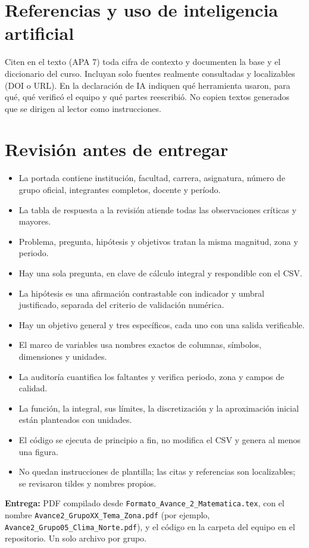 \documentclass[11pt,a4paper]{article}
\begin{document}
\section{Referencias y uso de inteligencia artificial}
Citen en el texto (APA 7) toda cifra de contexto y documenten la base y el diccionario del curso. Incluyan solo fuentes realmente consultadas y localizables (DOI o URL). En la declaración de IA indiquen qué herramienta usaron, para qué, qué verificó el equipo y qué partes reescribió. No copien textos generados que se dirigen al lector como instrucciones.

\section*{Revisión antes de entregar}
\begin{itemize}[label=$\square$]
  \item La portada contiene institución, facultad, carrera, asignatura, número de grupo oficial, integrantes completos, docente y período.
  \item La tabla de respuesta a la revisión atiende todas las observaciones críticas y mayores.
  \item Problema, pregunta, hipótesis y objetivos tratan la misma magnitud, zona y periodo.
  \item Hay una sola pregunta, en clave de cálculo integral y respondible con el CSV.
  \item La hipótesis es una afirmación contrastable con indicador y umbral justificado, separada del criterio de validación numérica.
  \item Hay un objetivo general y tres específicos, cada uno con una salida verificable.
  \item El marco de variables usa nombres exactos de columnas, símbolos, dimensiones y unidades.
  \item La auditoría cuantifica los faltantes y verifica periodo, zona y campos de calidad.
  \item La función, la integral, sus límites, la discretización y la aproximación inicial están planteados con unidades.
  \item El código se ejecuta de principio a fin, no modifica el CSV y genera al menos una figura.
  \item No quedan instrucciones de plantilla; las citas y referencias son localizables; se revisaron tildes y nombres propios.
\end{itemize}

\textbf{Entrega:} PDF compilado desde \texttt{Formato\_Avance\_2\_Matematica.tex}, con el nombre \texttt{Avance2\_GrupoXX\_Tema\_Zona.pdf} (por ejemplo, \texttt{Avance2\_Grupo05\_Clima\_Norte.pdf}), y el código en la carpeta del equipo en el repositorio. Un solo archivo por grupo.
\end{document}

